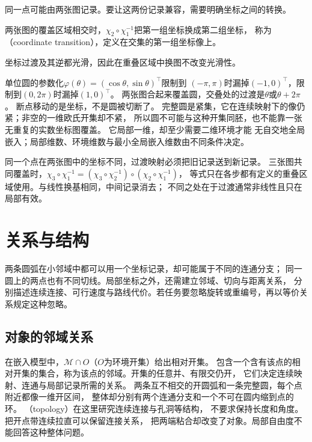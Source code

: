 同一点可能由两张图记录。要让这两份记录兼容，需要明确坐标之间的转换。
\begin{definition}[坐标过渡]
\label{def:geometry-chart-transition}
两张图的覆盖区域相交时，$\chi_2\circ\chi_1^{-1}$把第一组坐标换成第二组坐标，
称为（coordinate transition），定义在交集的第一组坐标像上。
\end{definition}
坐标过渡及其逆都光滑，因此在重叠区域中换图不改变光滑性。

单位圆的参数化$\varphi(\theta)=(\cos\theta,\sin\theta)^\top$限制到
$(-\pi,\pi)$时漏掉$(-1,0)^\top$，限制到$(0,2\pi)$时漏掉$(1,0)^\top$。
两张图合起来覆盖圆，交叠处的过渡是$\theta$或$\theta+2\pi$。
断点移动的是坐标，不是圆被切断了。
完整圆是紧集，它在连续映射下的像仍紧；非空的一维欧氏开集却不紧，
所以圆不可能与这种开集同胚，也不能靠一张无重复的实数坐标图覆盖。
它局部一维，却至少需要二维环境才能
无自交地全局嵌入；局部维数、环境维数与最小全局嵌入维数由不同条件决定。


同一个点在两张图中的坐标不同，过渡映射必须把旧记录送到新记录。
三张图共同覆盖时，$\chi_3\circ\chi_1^{-1}
=(\chi_3\circ\chi_2^{-1})\circ(\chi_2\circ\chi_1^{-1})$，
等式只在各步都有定义的重叠区域使用。与线性换基相同，中间记录消去；
不同之处在于过渡通常非线性且只在局部有效。

\section{关系与结构}
\label{sec:geometry-relations}

两条圆弧在小邻域中都可以用一个坐标记录，却可能属于不同的连通分支；
同一圆上的两点也有不同切线。局部坐标之外，还需建立邻域、切向与距离关系，
分别描述连续连接、可行速度与路线代价。若任务要忽略旋转或重编号，再以等价关系规定这种忽略。

\subsection{对象的邻域关系}
\label{sec:geometry-neighborhood-relations}
\label{sec:geometry-local-relations-topology}

\label{sec:geometry-neighborhood-topology}

在嵌入模型中，$\mathcal M\cap O$（$O$为环境开集）给出相对开集。
包含一个含有该点的相对开集的集合，称为该点的邻域。开集的任意并、有限交仍开，
它们决定连续映射、连通与局部记录所需的关系。
两条互不相交的开圆弧和一条完整圆，每个点附近都像一维开区间，
整体却分别有两个连通分支和一个不可在圆内缩到点的环。
（topology）在这里研究连续连接与孔洞等结构，
不要求保持长度和角度。把开点带连续拉直可以保留连接关系，
把两端粘合却改变了对象。局部自由度不能回答这种整体问题。

